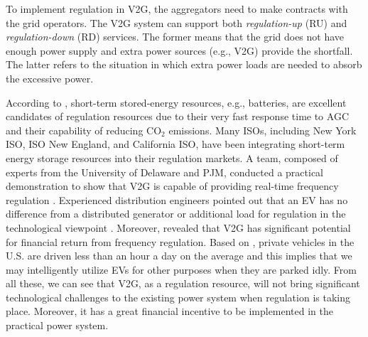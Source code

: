 \documentclass[journal]{IEEEtran}
\begin{document}
To implement regulation in V2G, the aggregators need to make contracts with the
grid operators.  The V2G system can support both \emph{regulation-up} (RU) and
\emph{regulation-down} (RD) services.  The former means that the grid does not have
enough power supply and extra power sources (e.g., V2G) provide the shortfall.
The latter refers to the situation in which extra power loads are needed to
absorb the excessive power. 


According to \cite{MISObook}, short-term stored-energy resources, e.g., batteries, are excellent candidates of regulation resources due to their very fast response time to AGC and their capability of reducing $\text{CO}_2$ emissions. Many ISOs, including New York ISO, ISO New England, and California ISO, have been integrating short-term energy storage resources into their regulation markets.
A team, composed of experts from the University of Delaware and PJM, conducted a practical demonstration to show that V2G is capable of providing real-time frequency regulation \cite{delaware}.
Experienced distribution engineers pointed out that an EV has no difference from a distributed generator or additional load for regulation in the technological viewpoint \cite{delaware}.
Moreover, \cite{financialreturn} revealed that V2G has significant potential for financial return from frequency regulation.
Based on \cite{traveltrends}, private vehicles in the U.S. are driven less than an hour a day on the average and this implies that we may intelligently utilize EVs for other purposes when they are parked idly. 
From all these, we can see that V2G, as a regulation resource, will not bring significant technological challenges to the existing power system when regulation is taking place. Moreover, it has a great financial incentive to be implemented in the practical power system.
\end{document}

